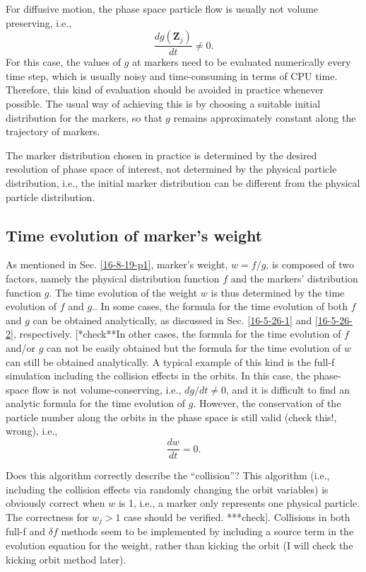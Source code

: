 \documentclass{article}
\begin{document}
For diffusive motion, the phase space particle flow is usually not volume
preserving, i.e.,
\begin{equation}
  \frac{d g (\mathbf{Z}_j)}{d t} \neq 0.
\end{equation}
For this case, the values of $g$ at markers need to be evaluated numerically
every time step, which is usually noisy and time-consuming in terms of CPU
time. Therefore, this kind of evaluation should be avoided in practice
whenever possible. The usual way of achieving this is by choosing a suitable
initial distribution for the markers, so that $g$ remains approximately
constant along the trajectory of markers{\cite{chen1997}}.

The marker distribution chosen in practice is determined by the desired
resolution of phase space of interest, not determined by the physical particle
distribution, i.e., the initial marker distribution can be different from the
physical particle distribution.

\subsection{Time evolution of marker's weight}

As mentioned in Sec. \ref{16-8-19-p1}, marker's weight, $w = f / g$, is
composed of two factors, namely the physical distribution function $f$ and the
markers' distribution function $g$. The time evolution of the weight $w$ is
thus determined by the time evolution of $f$ and $g$.. In some cases, the
formula for the time evolution of both $f$ and $g$ can be obtained
analytically, as discussed in Sec. \ref{16-5-26-1} and \ref{16-5-26-2},
respectively. [*check**In other cases, the formula for the time evolution of
$f$ and/or $g$ can not be easily obtained but the formula for the time
evolution of $w$ can still be obtained analytically. A typical example of this
kind is the full-f simulation including the collision effects in the orbits.
In this case, the phase-space flow is not volume-conserving, i.e., $d g / d t
\neq 0$, and it is difficult to find an analytic formula for the time
evolution of $g$. However, the conservation of the particle number along the
orbits in the phase space is still valid (check this!, wrong), i.e.,
\begin{equation}
  \frac{d w}{d t} = 0.
\end{equation}


Does this algorithm correctly describe the ``collision''? This algorithm
(i.e., including the collision effects via randomly changing the orbit
variables) is obviously correct when $w$ is 1, i.e., a marker only represents
one physical particle. The correctness for $w_j > 1$ case should be verified.
***check]. Collisions in both full-f and $\delta f$ methods seem to be
implemented by including a source term in the evolution equation for the
weight, rather than kicking the orbit (I will check the kicking orbit method
later).
\end{document}
